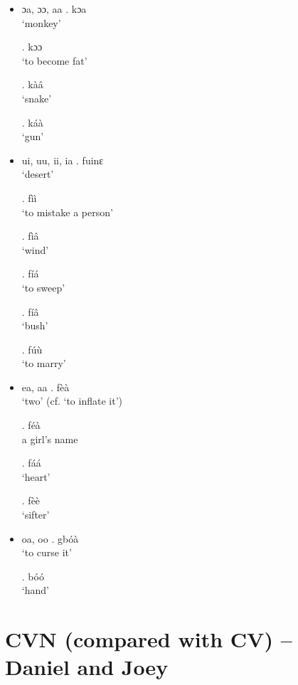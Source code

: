 \documentclass{assets/fieldnotes}
\begin{document}
\begin{itemize}
    \item ɔa, ɔɔ, aa
        \ex. kɔa\\
            `monkey'
        
        \ex. kɔɔ\\
            `to become fat'

        \ex. kàâ\\
            `snake'

        \ex. káà\\
            `gun'

    \item ui, uu, ii, ia
        \ex. fuinɛ\\
            `desert'

        \ex. fìì\\
            `to mistake a person'

        \ex. fìâ\\
            `wind'

        \ex. fíá\\
            `to sweep'

        \ex. fíâ\\
            `bush'

        \ex. fúù\\
            `to marry'

    \item ea, aa
        \ex. fèà\\
            `two' (cf. `to inflate it')

        \ex. féà\\
            a girl's name

        \ex. fáá\\
            `heart'

        \ex. fèè\\
            `sifter'

    \item oa, oo
        \ex. gbóà\\
            `to curse it'

        \ex. bóó\\
            `hand'
        
\end{itemize}

\section{CVN (compared with CV) -- Daniel and Joey}
\end{document}
